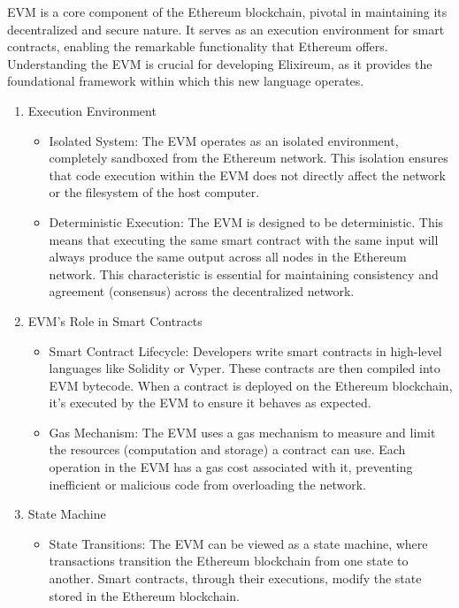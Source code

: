 EVM is a core component of the Ethereum blockchain, pivotal in maintaining its decentralized and secure nature. It serves as an execution environment for smart contracts, enabling the remarkable functionality that Ethereum offers. Understanding the EVM is crucial for developing Elixireum, as it provides the foundational framework within which this new language operates.

\begin{enumerate}
    \item  Execution Environment
          \begin{itemize}
              \item Isolated System: The EVM operates as an isolated environment, completely sandboxed from the Ethereum network. This isolation ensures that code execution within the EVM does not directly affect the network or the filesystem of the host computer.
              \item Deterministic Execution: The EVM is designed to be deterministic. This means that executing the same smart contract with the same input will always produce the same output across all nodes in the Ethereum network. This characteristic is essential for maintaining consistency and agreement (consensus) across the decentralized network.
          \end{itemize}
    \item EVM's Role in Smart Contracts
          \begin{itemize}
              \item Smart Contract Lifecycle: Developers write smart contracts in high-level languages like Solidity or Vyper. These contracts are then compiled into EVM bytecode. When a contract is deployed on the Ethereum blockchain, it's executed by the EVM to ensure it behaves as expected.
              \item           Gas Mechanism: The EVM uses a gas mechanism to measure and limit the resources (computation and storage) a contract can use. Each operation in the EVM has a gas cost associated with it, preventing inefficient or malicious code from overloading the network.
          \end{itemize}
    \item State Machine
          \begin{itemize}
              \item           State Transitions: The EVM can be viewed as a state machine, where transactions transition the Ethereum blockchain from one state to another. Smart contracts, through their executions, modify the state stored in the Ethereum blockchain.

\end{itemize}
\end{enumerate}
